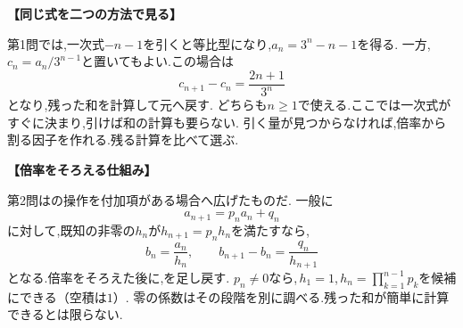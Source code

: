   \noindent\textbf{【同じ式を二つの方法で見る】}\par
  第1問では,一次式$-n-1$を引くと等比型になり,$a_n=3^n-n-1$を得る.
  一方,$c_n=a_n/3^{n-1}$と置いてもよい.この場合は
  \[
    c_{n+1}-c_n=\frac{2n+1}{3^n}
  \]
  となり,残った和を計算して元へ戻す.
  どちらも$n\ge1$で使える.ここでは一次式がすぐに決まり,引けば和の計算も要らない.
  引く量が見つからなければ,倍率から割る因子を作れる.残る計算を比べて選ぶ.

  \noindent\textbf{【倍率をそろえる仕組み】}\par
  第2問はの操作を付加項がある場合へ広げたものだ.
  一般に
  \[
    a_{n+1}=p_na_n+q_n
  \]
  に対して,既知の非零の$h_n$が$h_{n+1}=p_nh_n$を満たすなら,
  \[
    b_n=\frac{a_n}{h_n},\qquad
    b_{n+1}-b_n=\frac{q_n}{h_{n+1}}
  \]
  となる.倍率をそろえた後に,を足し戻す.
  $p_n\ne0$なら,\,$h_1=1$,\,$h_n=\prod_{k=1}^{n-1}p_k$を候補にできる（空積は$1$）.
  零の係数はその段階を別に調べる.残った和が簡単に計算できるとは限らない.
